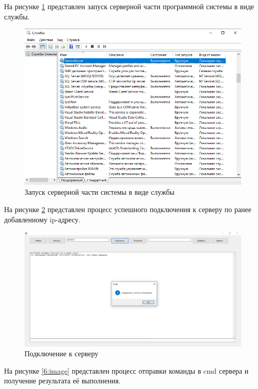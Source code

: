 На рисунке \ref{4:image} представлен запуск серверной части программной системы в виде службы.

\begin{figure}
	\centering
	\includegraphics[width=1\linewidth]{"images/4"}
	\caption{Запуск серверной части системы в виде службы}
	\label{4:image}
\end{figure}

На рисунке \ref{5:image} представлен процесс успешного подключения к серверу по ранее добавленному ip-адресу.

\begin{figure}
	\centering
	\includegraphics[width=1\linewidth]{"images/5"}
	\caption{Подключение к серверу}
	\label{5:image}
\end{figure}

На рисунке \ref{6:image} представлен процесс отправки команды в cmd сервера и получение результата её выполнения.

